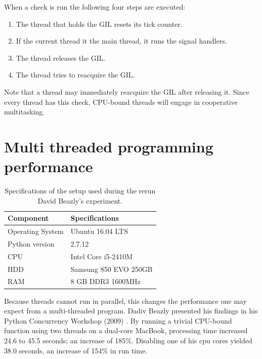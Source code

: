 

When a check is run the following four steps are executed:
\begin{enumerate}
	\item The thread that holds the GIL resets its tick counter.
	\item If the current thread it the main thread, it runs the signal handlers.
	\item The thread releases the GIL.
	\item The thread tries to reacquire the GIL.
\end{enumerate}

Note that a thread may immediately reacquire the GIL after releasing it.
Since every thread has this check, CPU-bound threads will engage in cooperative multitasking.

\section{Multi threaded programming performance}
\label{sct:multi_theaded_programming_performance}

\begin{table}[h]
	\centering
	\begin{tabular}{l|l}
		\textbf{Component} 	& \textbf{Specifications} \\ \hline
		Operating System   	& Ubuntu 16.04 LTS \\
		Python version		& 2.7.12 \\
		CPU					& Intel Core i5-2410M \\ 
		HDD					& Samsung 850 EVO 250GB  \\ 
		RAM					& 8 GB DDR3 1600MHz \\
	\end{tabular}
	\caption{Specifications of the setup used during the rerun David Beazly's experiment.}
	\label{table:rerun_beazily}
\end{table}

Because threads cannot run in parallel, this changes the performance one may expect from a multi-threaded program.
Dadiv Beazly presented his findings in his Python Concurrency Workshop (2009) \cite{beazley2009inside}.
By running a trivial CPU-bound function using two threads on a dual-core MacBook, processing time increased 24.6 to 45.5 seconds; an increase of 185\%.
Disabling one of his cpu cores yielded 38.0 seconds, an increase of 154\% in run time.

